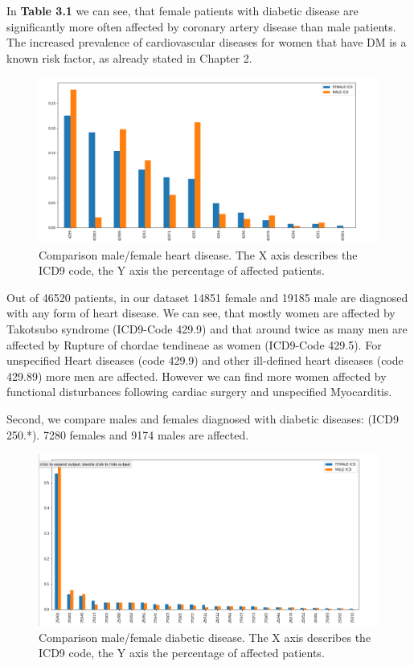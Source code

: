 \documentclass[11pt, a4paper]{book}
\begin{document}
In \textbf{Table 3.1} we can see, that female patients with diabetic disease are significantly more often affected by coronary artery disease than male patients. The increased prevalence of cardiovascular diseases for women that have DM is a known risk factor, as already stated in Chapter 2.

\begin{figure}
  \begin{center}
  \includegraphics[width=1\textwidth]{img/male_female_heart_disease.png}
  \caption{Comparison male/female heart disease. The X axis describes the ICD9 code, the Y axis the percentage of affected patients.}
  \label{fig:heart_disease_comparison}
  \end{center}
\end{figure}

Out of 46520 patients, in our dataset 14851 female and 19185 male are diagnosed with any form of heart disease. We can see, that mostly women are affected by Takotsubo syndrome (ICD9-Code 429.9) and that around twice as many men are affected by Rupture of chordae tendineae as women (ICD9-Code 429.5). For unspecified Heart diseases (code 429.9) and other ill-defined heart diseases (code 429.89) more men are affected.  However we can find more women affected by functional disturbances following cardiac surgery and unspecified Myocarditis. 

Second, we compare males and females diagnosed with diabetic diseases: (ICD9 250.*). 7280 females and 9174 males are affected.

\begin{figure}
  \begin{center}
  \includegraphics[width=1\textwidth]{img/comparison_diabetic.png}
  \caption{Comparison male/female diabetic disease. The X axis describes the ICD9 code, the Y axis the percentage of affected patients.}
  \label{fig:diabetic_comparison}
  \end{center}
\end{figure}
\end{document}
